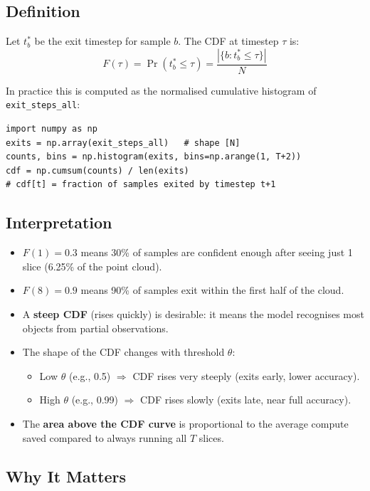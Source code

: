 \documentclass[11pt,a4paper]{article}
\begin{document}
\subsection{Definition}

Let $t^*_b$ be the exit timestep for sample $b$. The CDF at timestep $\tau$ is:
\[
  F(\tau) = \Pr(t^*_b \le \tau)
          = \frac{|\{b : t^*_b \le \tau\}|}{N}
\]

In practice this is computed as the normalised cumulative histogram of
\texttt{exit\_steps\_all}:

\begin{lstlisting}
import numpy as np
exits = np.array(exit_steps_all)   # shape [N]
counts, bins = np.histogram(exits, bins=np.arange(1, T+2))
cdf = np.cumsum(counts) / len(exits)
# cdf[t] = fraction of samples exited by timestep t+1
\end{lstlisting}

\subsection{Interpretation}

\begin{itemize}
  \item $F(1) = 0.3$ means 30\% of samples are confident enough after
        seeing just 1 slice (6.25\% of the point cloud).
  \item $F(8) = 0.9$ means 90\% of samples exit within the first half of
        the cloud.
  \item A \textbf{steep CDF} (rises quickly) is desirable: it means the
        model recognises most objects from partial observations.
  \item The shape of the CDF changes with threshold $\theta$:
        \begin{itemize}
          \item Low $\theta$ (e.g., 0.5) $\Rightarrow$ CDF rises very steeply
                (exits early, lower accuracy).
          \item High $\theta$ (e.g., 0.99) $\Rightarrow$ CDF rises slowly
                (exits late, near full accuracy).
        \end{itemize}
  \item The \textbf{area above the CDF curve} is proportional to the
        average compute saved compared to always running all $T$ slices.
\end{itemize}

\subsection{Why It Matters}
\end{document}
